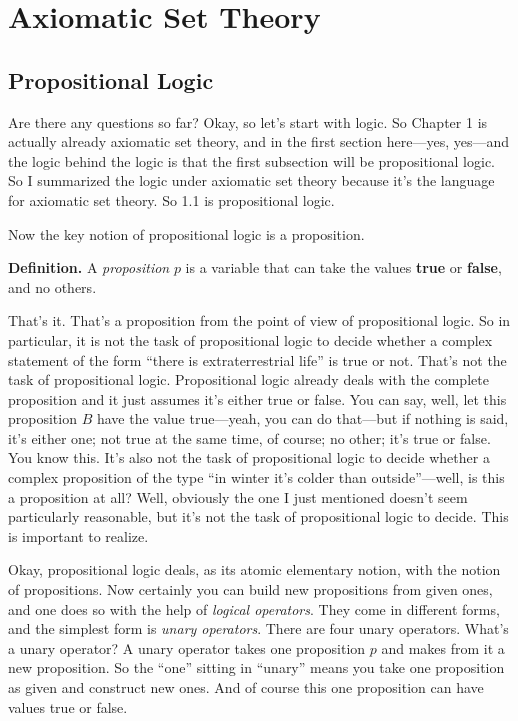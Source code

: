 \chapter{Axiomatic Set Theory}

\section{Propositional Logic}

Are there any questions so far? Okay, so let's start with logic. So Chapter 1 is actually already axiomatic set theory, and in the first section here---yes, yes---and the logic behind the logic is that the first subsection will be propositional logic. So I summarized the logic under axiomatic set theory because it's the language for axiomatic set theory. So 1.1 is propositional logic.

Now the key notion of propositional logic is a proposition.

\textbf{Definition.} A \emph{proposition} $p$ is a variable that can take the values \textbf{true} or \textbf{false}, and no others.

That's it. That's a proposition from the point of view of propositional logic. So in particular, it is not the task of propositional logic to decide whether a complex statement of the form ``there is extraterrestrial life'' is true or not. That's not the task of propositional logic. Propositional logic already deals with the complete proposition and it just assumes it's either true or false. You can say, well, let this proposition $B$ have the value true---yeah, you can do that---but if nothing is said, it's either one; not true at the same time, of course; no other; it's true or false. You know this. It's also not the task of propositional logic to decide whether a complex proposition of the type ``in winter it's colder than outside''---well, is this a proposition at all? Well, obviously the one I just mentioned doesn't seem particularly reasonable, but it's not the task of propositional logic to decide. This is important to realize.

Okay, propositional logic deals, as its atomic elementary notion, with the notion of propositions. Now certainly you can build new propositions from given ones, and one does so with the help of \emph{logical operators}. They come in different forms, and the simplest form is \emph{unary operators}. There are four unary operators. What's a unary operator? A unary operator takes one proposition $p$ and makes from it a new proposition. So the ``one'' sitting in ``unary'' means you take one proposition as given and construct new ones. And of course this one proposition can have values true or false.

